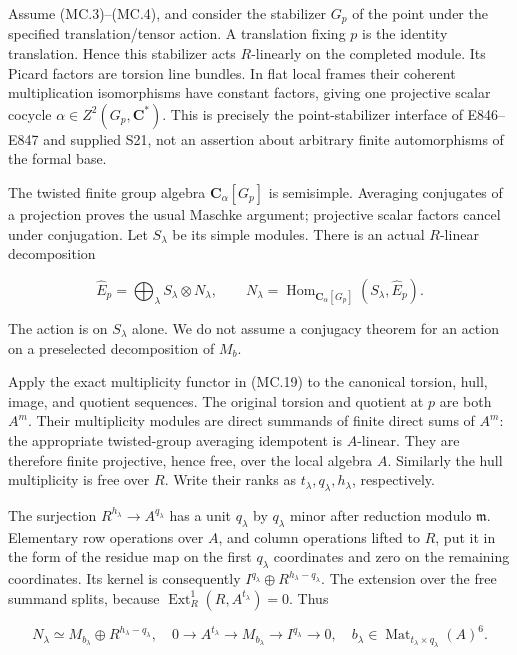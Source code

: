 Assume (MC.3)--(MC.4), and consider the stabilizer \(G_p\) of the
point under the specified translation/tensor action. A translation
fixing \(p\) is the identity translation. Hence this stabilizer acts
\(R\)-linearly on the completed module. Its Picard factors are
torsion line bundles. In flat local frames their coherent multiplication
isomorphisms have constant factors, giving one projective scalar
cocycle \(\alpha\in Z^2(G_p,\mathbf C^*)\). This is precisely the
point-stabilizer interface of E846--E847 and supplied S21, not an
assertion about arbitrary finite automorphisms of the formal base.

The twisted finite group algebra \(\mathbf C_\alpha[G_p]\) is
semisimple. Averaging conjugates of a projection proves the usual
Maschke argument; projective scalar factors cancel under conjugation.
Let \(S_\lambda\) be its simple modules. There is an actual
\(R\)-linear decomposition

\[
 \widehat E_p=\bigoplus_\lambda S_\lambda\otimes N_\lambda,
 \qquad
 N_\lambda=\operatorname{Hom}_{\mathbf C_\alpha[G_p]}
                         (S_\lambda,\widehat E_p).
 \tag{MC.19}
\]

The action is on \(S_\lambda\) alone. We do not assume a conjugacy
theorem for an action on a preselected decomposition of \(M_b\).

Apply the exact multiplicity functor in (MC.19) to the canonical
torsion, hull, image, and quotient sequences. The original torsion
and quotient at \(p\) are both \(A^m\). Their multiplicity modules
are direct summands of finite direct sums of \(A^m\): the appropriate
twisted-group averaging idempotent is \(A\)-linear. They are therefore
finite projective, hence free, over the local algebra \(A\). Similarly
the hull multiplicity is free over \(R\). Write their ranks as
\(t_\lambda,q_\lambda,h_\lambda\), respectively.

The surjection \(R^{h_\lambda}\to A^{q_\lambda}\) has a unit
\(q_\lambda\) by \(q_\lambda\) minor after reduction modulo
\(\mathfrak m\). Elementary row operations over \(A\), and column
operations lifted to \(R\), put it in the form of the residue map
on the first \(q_\lambda\) coordinates and zero on the remaining
coordinates. Its kernel is consequently
\(I^{q_\lambda}\oplus R^{h_\lambda-q_\lambda}\).
The extension over the free summand splits, because
\(\operatorname{Ext}^1_R(R,A^{t_\lambda})=0\). Thus

\[
 N_\lambda\simeq M_{b_\lambda}\oplus R^{h_\lambda-q_\lambda},
 \quad
 0\longrightarrow A^{t_\lambda}\longrightarrow M_{b_\lambda}
      \longrightarrow I^{q_\lambda}\longrightarrow0,
 \quad
 b_\lambda\in\operatorname{Mat}_{t_\lambda\times q_\lambda}(A)^6.
 \tag{MC.20}
\]

